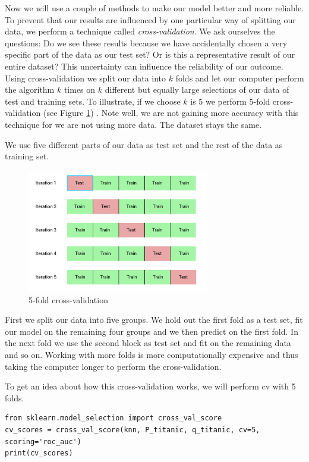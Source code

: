 \documentclass[11pt]{article}
\begin{document}
Now we will use a couple of methods to make our model better and more reliable. To prevent that our results are influenced by one particular way of splitting our data, we perform a technique called \emph{cross-validation}. We ask ourselves the questions: Do we see these results because we have accidentally chosen a very specific part of the data as our test set? Or is this a representative result of our entire dataset? This uncertainty can influence the reliability of our outcome. Using cross-validation we split our data into \(k\) folds and let our computer perform the algorithm \(k\) times on \(k\) different but equally large selections of our data of test and training sets. To illustrate, if we choose \(k\) is 5 we perform 5-fold cross-validation (see Figure \ref{tab:5-foldcross}) . Note well, we are not gaining more accuracy with this technique for we are not using more data. The dataset stays the same. 

We use five different parts of our data as test set and the rest of the data as training set.


\begin{figure}[htbp]
\centering
\includegraphics[width=300px]{./CrossValidation.png}
\caption{\label{tab:5-foldcross}
5-fold cross-validation}
\end{figure}


First we split our data into five groups. We hold out the first fold as a test set, fit our model on the remaining four groups and we then predict on the first fold. In the next fold we use the second block as test set and fit on the remaining data and so on. Working with more folds is more computationally expensive and thus taking the computer longer to perform the cross-validation. 

To get an idea about how this cross-validation works, we will perform cv with 5 folds. 

\begin{verbatim}
from sklearn.model_selection import cross_val_score
cv_scores = cross_val_score(knn, P_titanic, q_titanic, cv=5, scoring='roc_auc')
print(cv_scores)
\end{verbatim}
\end{document}
